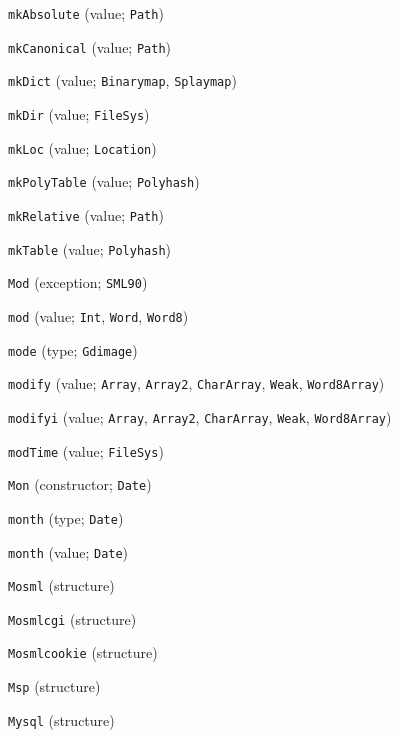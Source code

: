 \begin{description}
\item[] \verb"mkAbsolute" (value; \verb"Path")
\item[] \verb"mkCanonical" (value; \verb"Path")
\item[] \verb"mkDict" (value; \verb"Binarymap", \verb"Splaymap")
\item[] \verb"mkDir" (value; \verb"FileSys")
\item[] \verb"mkLoc" (value; \verb"Location")
\item[] \verb"mkPolyTable" (value; \verb"Polyhash")
\item[] \verb"mkRelative" (value; \verb"Path")
\item[] \verb"mkTable" (value; \verb"Polyhash")
\item[] \verb"Mod" (exception; \verb"SML90")
\item[] \verb"mod" (value; \verb"Int", \verb"Word", \verb"Word8")
\item[] \verb"mode" (type; \verb"Gdimage")
\item[] \verb"modify" (value; \verb"Array", \verb"Array2", \verb"CharArray", \verb"Weak", \verb"Word8Array")
\item[] \verb"modifyi" (value; \verb"Array", \verb"Array2", \verb"CharArray", \verb"Weak", \verb"Word8Array")
\item[] \verb"modTime" (value; \verb"FileSys")
\item[] \verb"Mon" (constructor; \verb"Date")
\item[] \verb"month" (type; \verb"Date")
\item[] \verb"month" (value; \verb"Date")
\item[] \verb"Mosml" (structure)
\item[] \verb"Mosmlcgi" (structure)
\item[] \verb"Mosmlcookie" (structure)
\item[] \verb"Msp" (structure)
\item[] \verb"Mysql" (structure)
\\[2ex]


\end{description}
